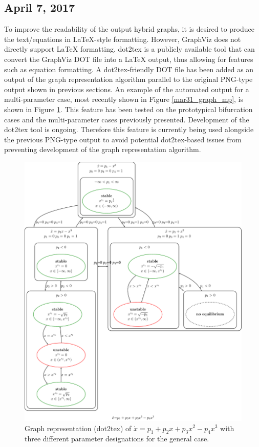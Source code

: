 \documentclass[12pt]{article}
\begin{document}
\subsection{April 7, 2017}
To improve the readability of the output hybrid graphs, it is desired to produce the text/equations in LaTeX-style formatting. However, GraphViz does not directly support LaTeX formatting. dot2tex \cite{fauske} is a publicly available tool that can convert the GraphViz DOT file into a LaTeX output, thus allowing for features such as equation formatting. A dot2tex-friendly DOT file has been added as an output of the graph representation algorithm parallel to the original PNG-type output shown in previous sections. An example of the automated output for a multi-parameter case, most recently shown in Figure \ref{mar31_graph_mp}, is shown in Figure \ref{apr07_graph_mp}. This feature has been tested on the prototypical bifurcation cases and the multi-parameter cases previously presented. Development of the dot2tex tool is ongoing. Therefore this feature is currently being used alongside the previous PNG-type output to avoid potential dot2tex-based issues from preventing development of the graph representation algorithm. 

\begin{figure}[H]
\begin{center}
\includegraphics[width=6in]{apr07_texgraph_mp1.pdf}
\caption{Graph representation (dot2tex) of $\dot{x}=p_1+p_2x+p_3x^2-p_4x^3$ with three different parameter designations for the general case.}
\label{apr07_graph_mp}
\end{center}
\end{figure}
\end{document}
